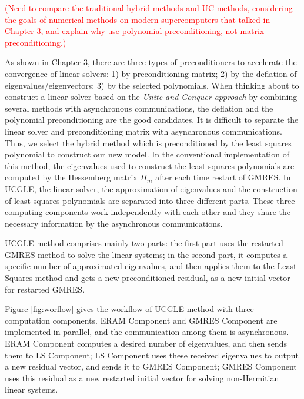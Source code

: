 \textcolor{red}{(Need to compare the traditional hybrid methods and UC methods, considering the goals of numerical methods on modern supercomputers that talked in Chapter 3, and explain why use polynomial preconditioning, not matrix preconditioning.)}

As shown in Chapter 3, there are three types of preconditioners to accelerate the convergence of linear solvers: 1) by preconditioning matrix; 2) by the deflation of eigenvalues/eigenvectors; 3) by the selected polynomials. When thinking about to construct a linear solver based on the \textit{Unite and Conquer approach} by combining several methods with asynchronous communications, the deflation and the polynomial preconditioning are the good candidates. It is difficult to separate the linear solver and preconditioning matrix with asynchronous communications. Thus, we select the hybrid method which is preconditioned by the least squares polynomial to construct our new model. In the conventional implementation of this method, the eigenvalues used to construct the least squares polynomials are computed by the Hessemberg matrix $H_m$ after each time restart of GMRES. In UCGLE, the linear solver, the approximation of eigenvalues and the construction of least squares polynomials are separated into three different parts. These three computing components work independently with each other and they share the necessary information by the asynchronous communications.

UCGLE method comprises mainly two parts: the first part uses the restarted GMRES method to solve the linear systems; in the second part, it computes a specific number of approximated eigenvalues, and then applies them to the Least Squares method and gets a new preconditioned residual, as a new initial vector for restarted GMRES. 

Figure \ref{fig:worflow} gives the workflow of UCGLE method with three computation components. ERAM Component and GMRES Component are implemented in parallel, and the communication among them is asynchronous. ERAM Component computes a desired number of eigenvalues, and then sends them to LS Component; LS Component uses these received eigenvalues to output a new residual vector, and sends it to GMRES Component; GMRES Component uses this residual as a new restarted initial vector for solving non-Hermitian linear systems.

